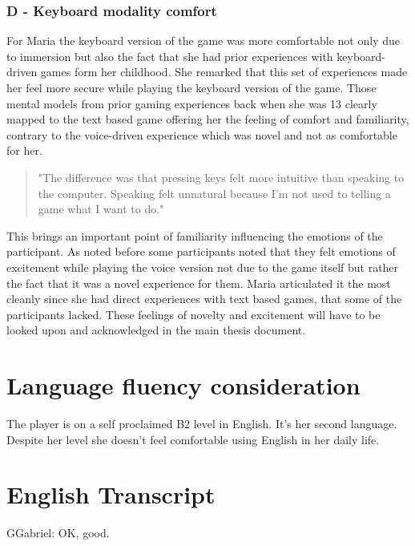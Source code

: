 \subsubsection{D - Keyboard modality comfort}

For Maria the keyboard version of the game was more comfortable not only due to immersion but also the fact that she had prior experiences with keyboard-driven games form her childhood. She remarked that this set of experiences made her feel more secure while playing the keyboard version of the game. Those mental models from prior gaming experiences back when she was 13 clearly mapped to the text based game offering her the feeling of comfort and familiarity, contrary to the voice-driven experience which was novel and not as comfortable for her. 

\begin{quote}
    "The difference was that pressing keys felt more intuitive than speaking to the computer.
    Speaking felt unnatural because I’m not used to telling a game what I want to do."
\end{quote}


This brings an important point of familiarity influencing the emotions of the participant. As noted before some participants noted that they felt emotions of excitement while playing the voice version not due to the game itself but rather the fact that it was a novel experience for them. Maria articulated it the most cleanly since she had direct experiences with text based games, that some of the participants lacked. 
These feelings of novelty and excitement will have to be looked upon and acknowledged in the main thesis document.





\section{Language fluency consideration}


The player is on a self proclaimed B2 level in English. It's her second language. Despite her level she doesn't feel comfortable using English in her daily life. 

\section{English Transcript}
GGabriel: OK, good.

